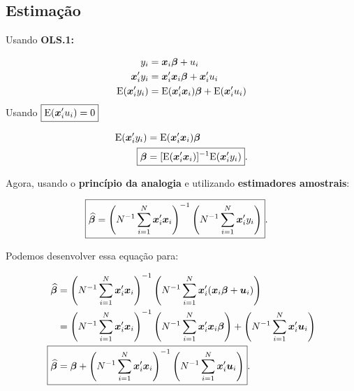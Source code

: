 \documentclass[11pt, oneside, a4paper, article]{article}
\numberwithin{equation}{section}
\begin{document}
\subsection{Estimação} 

Usando \textbf{OLS.1:}

\vspace{-1.5 em}
\begin{align*}
y_{i} &= \boldsymbol{x}_{i} \boldsymbol{\beta} + u_{i} 
\\
\boldsymbol{x}_{i}' y_{i} &= \boldsymbol{x}_{i}' \boldsymbol{x}_{i} \boldsymbol{\beta} + \boldsymbol{x}_{i}' u_{i} 
\\
\text{E}( \boldsymbol{x}_{i}' y_{i}) &= \text{E}( \boldsymbol{x}_{i}' \boldsymbol{x}_{i} ) \boldsymbol{\beta} + \text{E}( \boldsymbol{x}_{i}' u_{i} ) 
\end{align*}
Usando $\boxed{\text{E}( \boldsymbol{x}_{i}' u_{i} ) = 0}$ 

\vspace{-1 em}
\begin{align}
\notag
\E( \xvec_{i}' y_{i}) &= \E( \xvec_{i}' \xvec_{i} ) \betavec
\\
\label{ols:beta}
\Aboxed{\betavec &= [\E( \xvec_{i}' \xvec_{i} )]^{-1} \E( \xvec_{i}' y_{i}) }.
\end{align}

Agora, usando o \textbf{princípio da analogia} e utilizando \textbf{estimadores amostrais}:

\vspace{-1 em}
\begin{align}\label{ols:betahat:sums}
	\Aboxed{
\betahatbold &= 
\left( N^{-1} \sum_{i=1}^{N} \xvec_{i}' \xvec_{i} \right)^{-1}
\left( N^{-1} \sum_{i=1}^{N} \xvec_{i}' y_{i} \right) }.
\end{align}

Podemos desenvolver essa equação para:

\vspace{-1 em}
\begin{align}
	\notag
\betahatbold &= 
\left( N^{-1} \sum_{i=1}^{N} \xvec_{i}' \xvec_{i} \right)^{-1}
\left( N^{-1} \sum_{i=1}^{N} \xvec_{i}' (\xvec_{i} \betavec + \uvec_{i}) \right)
\\
	\notag
&=
\left( N^{-1} \sum_{i=1}^{N} \xvec_{i}' \xvec_{i} \right)^{-1}
\left( N^{-1} \sum_{i=1}^{N} \xvec_{i}' \xvec_{i} \betavec \right) +
\left( N^{-1} \sum_{i=1}^{N} \xvec_{i}' \uvec_{i} \right)
\\
\label{ols:betahat:u}
\Aboxed{
\betahatbold &= 
\betavec +
\left( N^{-1} \sum_{i=1}^{N} \xvec_{i}' \xvec_{i} \right)^{-1}
\left( N^{-1} \sum_{i=1}^{N} \xvec_{i}' \uvec_{i} \right) }.
\end{align}
\end{document}
